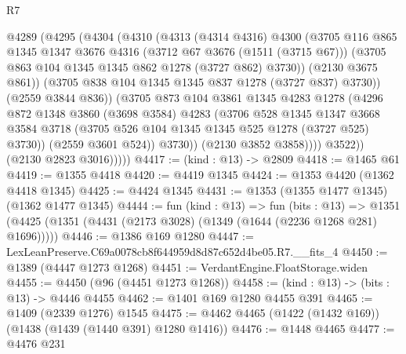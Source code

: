 \begin{lexlean}{R7}
\begin{coremodule}
                    @4289
                      (@4295
                        (@4304
                          (@4310
                            (@4313
                              (@4314 @4316)
                              @4300
                              (@3705
                                @116
                                @865
                                @1345
                                @1347
                                @3676
                                @4316
                                (@3712 @67 @3676 (@1511 (@3715 @67)))
                                (@3705 @863 @104 @1345 @1345 @862 @1278 (@3727 @862) @3730))
                              (@2130 @3675 @861))
                            (@3705 @838 @104 @1345 @1345 @837 @1278 (@3727 @837) @3730))
                          (@2559 @3844 @836))
                        (@3705
                          @873
                          @104
                          @3861
                          @1345
                          @4283
                          @1278
                          (@4296
                            @872
                            @1348
                            @3860
                            (@3698 @3584)
                            @4283
                            (@3706
                              @528
                              @1345
                              @1347
                              @3668
                              @3584
                              @3718
                              (@3705 @526 @104 @1345 @1345 @525 @1278 (@3727 @525) @3730))
                            (@2559 @3601 @524))
                          @3730))
                      (@2130 @3852 @3858))))
                @3522))
            (@2130 @2823 @3016)))))
@4417 := (kind : @13) -> @2809
@4418 := @1465 @61
@4419 := @1355 @4418
@4420 := @4419 @1345
@4424 := @1353 @4420 (@1362 @4418 @1345)
@4425 := @4424 @1345
@4431 := @1353 (@1355 @1477 @1345) (@1362 @1477 @1345)
@4444 := fun (kind : @13) =>
  fun (bits : @13) =>
  @1351 (@4425 (@1351 (@4431 (@2173 @3028) (@1349 (@1644 (@2236 @1268 @281) @1696)))))
@4446 := @1386 @169 @1280
@4447 := LexLeanPreserve.C69a0078cb8f644959d8d87c652d4be05.R7.__fits_4
@4450 := @1389 (@4447 @1273 @1268)
@4451 := VerdantEngine.FloatStorage.widen
@4455 := @4450 (@96 (@4451 @1273 @1268))
@4458 := (kind : @13) -> (bits : @13) -> @4446 @4455
@4462 := @1401 @169 @1280 @4455 @391
@4465 := @1409 (@2339 @1276) @1545
@4475 := @4462 @4465 (@1422 (@1432 @169)) (@1438 (@1439 (@1440 @391) @1280 @1416))
@4476 := @1448 @4465
@4477 := @4476 @231

\end{coremodule}
\end{lexlean}
